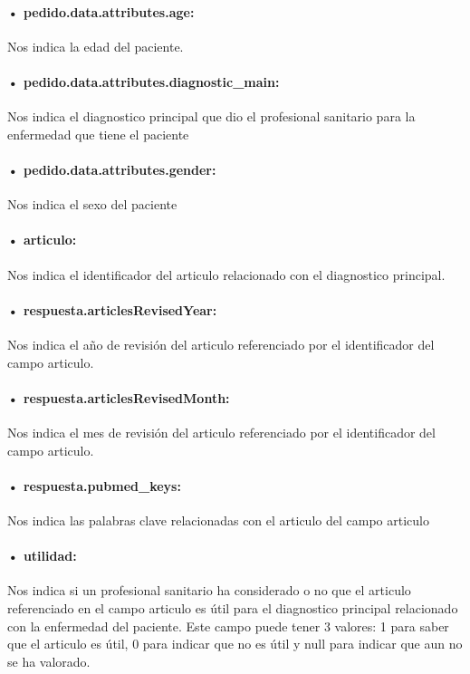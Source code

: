 \paragraph{• pedido.data.attributes.age:} Nos indica la edad del paciente.
\paragraph{• pedido.data.attributes.diagnostic\_main:} Nos indica el diagnostico principal que dio el profesional sanitario para la enfermedad que tiene el paciente
\paragraph{• pedido.data.attributes.gender:} Nos indica el sexo del paciente
\paragraph{• articulo:} Nos indica el identificador del articulo relacionado con el diagnostico principal.
\paragraph{• respuesta.articlesRevisedYear:} Nos indica el año de revisión del articulo referenciado por el identificador del campo articulo.
\paragraph{• respuesta.articlesRevisedMonth:} Nos indica el mes de revisión del articulo referenciado por el identificador del campo articulo.
\paragraph{• respuesta.pubmed\_keys:} Nos indica las palabras clave relacionadas con el articulo del campo articulo
\paragraph{• utilidad:} Nos indica si un profesional sanitario ha considerado o no que el articulo referenciado en el campo articulo es útil para el diagnostico principal relacionado con la enfermedad del paciente. Este campo puede tener 3 valores: 1 para saber que el articulo es útil, 0 para indicar que no es útil y null para indicar que aun no se ha valorado.